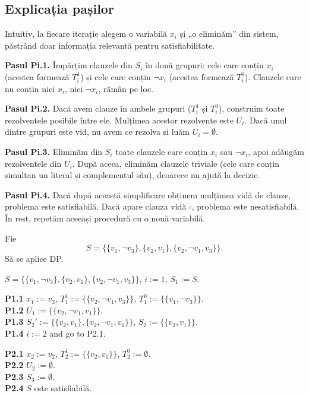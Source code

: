 \subsection*{Explicația pașilor}

Intuitiv, la fiecare iterație alegem o variabilă \(x_i\) și „o eliminăm” din sistem, păstrând doar informația relevantă pentru satisfiabilitate.

\noindent \textbf{Pasul Pi.1.} Împărțim clauzele din \(S_i\) în două grupuri: cele care conțin \(x_i\) (acestea formează \(T_i^1\)) și cele care conțin \(\neg x_i\) (acestea formează \(T_i^0\)). Clauzele care nu conțin nici \(x_i\), nici \(\neg x_i\), rămân pe loc.

\noindent \textbf{Pasul Pi.2.} Dacă avem clauze în ambele grupuri (\(T_i^1\) și \(T_i^0\)), construim toate rezolventele posibile între ele. Mulțimea acestor rezolvente este \(U_i\). Dacă unul dintre grupuri este vid, nu avem ce rezolva și luăm \(U_i=\emptyset\).

\noindent \textbf{Pasul Pi.3.} Eliminăm din \(S_i\) toate clauzele care conțin \(x_i\) sau \(\neg x_i\), apoi adăugăm rezolventele din \(U_i\). După aceea, eliminăm clauzele triviale (cele care conțin simultan un literal și complementul său), deoarece nu ajută la decizie.

\noindent \textbf{Pasul Pi.4.} Dacă după această simplificare obținem mulțimea vidă de clauze, problema este satisfiabilă. Dacă apare clauza vidă \( \square \), problema este nesatisfiabilă. În rest, repetăm aceeași procedură cu o nouă variabilă.

\begin{ex}
	Fie
	\[
		S = \{\{v_1, \neg v_3\}, \{v_2, v_1\}, \{v_2, \neg v_1, v_3\}\}.
	\]
	Să se aplice DP.
\end{ex}

\begin{solutie}
	\noindent \(S = \{\{v_1, \neg v_3\}, \{v_2, v_1\}, \{v_2, \neg v_1, v_3\}\}\), \(i := 1\), \(S_1 := S\).

	\noindent \textbf{P1.1} \(x_1 := v_3\), \(T_1^1 := \{\{v_2, \neg v_1, v_3\}\}\), \(T_1^0 := \{\{v_1, \neg v_3\}\}\).\\
	\textbf{P1.2} \(U_1 := \{\{v_2, \neg v_1, v_1\}\}\).\\
	\textbf{P1.3} \(S_2' := \{\{v_2, v_1\}, \{v_2, \neg v_1, v_1\}\}\), \(S_2 := \{\{v_2, v_1\}\}\).\\
	\textbf{P1.4} \(i := 2\) and go to P2.1.

	\vspace{0.2cm}
	\noindent \textbf{P2.1} \(x_2 := v_2\), \(T_2^1 := \{\{v_2, v_1\}\}\), \(T_2^0 := \emptyset\).\\
	\textbf{P2.2} \(U_2 := \emptyset\).\\
	\textbf{P2.3} \(S_3 := \emptyset\).\\
	\textbf{P2.4} \(S\) este satisfiabilă.
\end{solutie}

